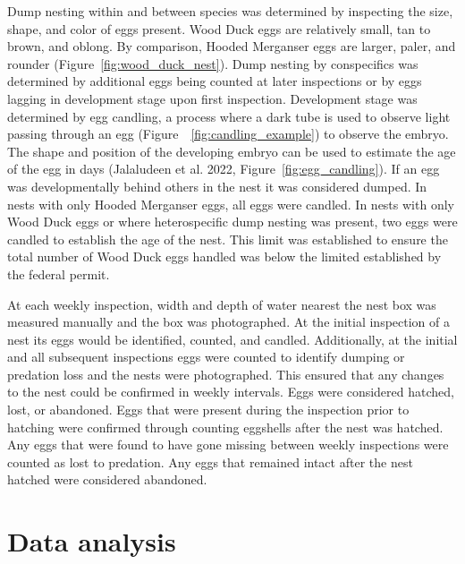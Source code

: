  

Dump nesting within and between species was determined by inspecting the size, shape, and color of eggs present. Wood Duck eggs are relatively small, tan to brown, and oblong. By comparison, Hooded Merganser eggs are larger, paler, and rounder (Figure~\ref{fig:wood_duck_nest}). Dump nesting by conspecifics was determined by additional eggs being counted at later inspections or by eggs lagging in development stage upon first inspection. Development stage was determined by egg candling, a process where a dark tube is used to observe light passing through an egg (Figure~~\ref{fig:candling_example}) to observe the embryo. The shape and position of the developing embryo can be used to estimate the age of the egg in days (Jalaludeen et al. 2022, Figure~\ref{fig:egg_candling}).  If an egg was developmentally behind others in the nest it was considered dumped.  In nests with only Hooded Merganser eggs, all eggs were candled. In nests with only Wood Duck eggs or where heterospecific dump nesting was present, two eggs were candled to establish the age of the nest. This limit was established to ensure the total number of Wood Duck eggs handled was below the limited established by the federal permit.

 

 

 

At each weekly inspection, width and depth of water nearest the nest box was measured manually and the box was photographed. At the initial inspection of a nest its eggs would be identified, counted, and candled. Additionally, at the initial and all subsequent inspections eggs were counted to identify dumping or predation loss and the nests were photographed. This ensured that any changes to the nest could be confirmed in weekly intervals. Eggs were considered hatched, lost, or abandoned. Eggs that were present during the inspection prior to hatching were confirmed through counting eggshells after the nest was hatched. Any eggs that were found to have gone missing between weekly inspections were counted as lost to predation.  Any eggs that remained intact after the nest hatched were considered abandoned.  

\section*{Data analysis}

